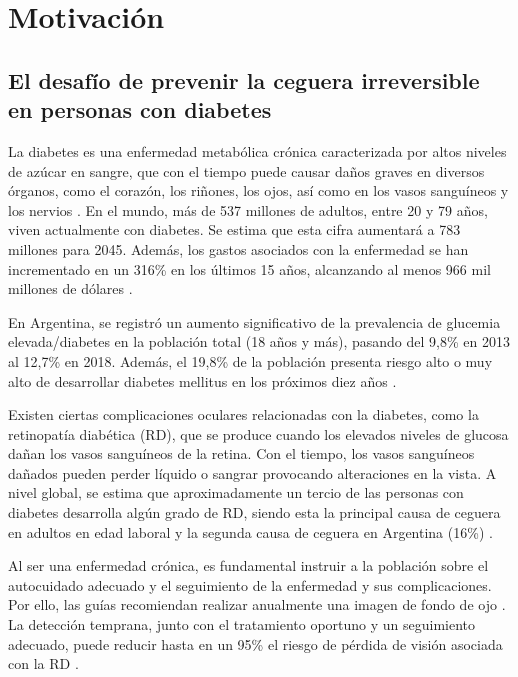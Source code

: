 \chapter{Motivación}


\section{El desafío de prevenir la ceguera irreversible en personas con diabetes}
La diabetes es una enfermedad metabólica crónica caracterizada por altos niveles de azúcar en sangre, que con el tiempo puede causar daños graves en diversos órganos, como el corazón, los riñones, los ojos, así como en los vasos sanguíneos y los nervios \parencites{ops_diabetes}. En el mundo, más de 537 millones de adultos, entre 20 y 79 años, viven actualmente con diabetes. Se estima que esta cifra aumentará a 783 millones para 2045. Además, los gastos asociados con la enfermedad se han incrementado en un 316\% en los últimos 15 años, alcanzando al menos 966 mil millones de dólares \parencites{idf_2021}.


En Argentina, se registró un aumento significativo de la prevalencia de glucemia elevada/diabetes en la población total (18 años y más), pasando del 9,8\% en 2013 al 12,7\% en 2018. Además, el 19,8\% de la población presenta riesgo alto o muy alto de desarrollar diabetes mellitus en los próximos diez años  \parencites{indec2019}. 

Existen ciertas complicaciones oculares relacionadas con la diabetes, como la retinopatía diabética (RD), que se produce cuando los elevados niveles de glucosa dañan los vasos sanguíneos de la retina. Con el tiempo, los vasos sanguíneos dañados pueden perder líquido o sangrar provocando alteraciones en la vista. A nivel global, se estima que aproximadamente un tercio de las personas con diabetes desarrolla algún grado de RD, siendo esta la principal causa de ceguera en adultos en edad laboral \parencites{idf_2021} y la segunda causa de ceguera en Argentina (16\%) \parencites{silva2015}.

Al ser una enfermedad crónica, es fundamental instruir a la población sobre el autocuidado adecuado y el seguimiento de la enfermedad y sus complicaciones. Por ello, las guías recomiendan realizar anualmente una imagen de fondo de ojo \parencites{ops_diabetes, ops_clinica_diabetes}. La detección temprana, junto con el tratamiento oportuno y un seguimiento adecuado, puede reducir hasta en un 95\% el riesgo de pérdida de visión asociada con la RD \parencites{nei2023}.

